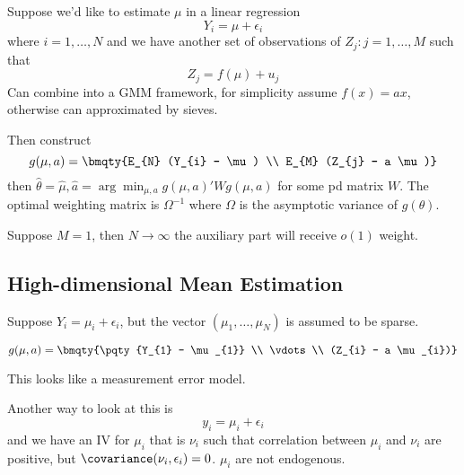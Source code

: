 Suppose we'd like to estimate \(\mu\) in a linear regression 
\begin{equation*}
    Y_{i} = \mu + \epsilon_{i} 
\end{equation*}
where \(i = 1,\dots,N\)
and we have another set of observations of \(Z_{j}: j =1,\dots,M\) such that 
\begin{equation*}
    Z_{j} = f (\mu) + u_{j}
\end{equation*}
Can combine into a GMM framework, for simplicity assume \(f(x)= ax\), otherwise can approximated by sieves. 

Then construct 
\begin{equation*}
    g(\mu, a) = \bmqty{E_{N} (Y_{i} - \mu) \\ E_{M} (Z_{j} - a \mu)}  
\end{equation*}
then \(\hat{\theta} = \hat{\mu}, \hat{a} = \arg \min_{\mu,a} g(\mu,a)' W g(\mu,a)\) for some pd matrix \(W\). The optimal weighting matrix is \(\Omega^{-1}\) where \(\Omega\) is the asymptotic variance of \({g}(\theta)\).

Suppose \(M= 1\), then \(N\to \infty\) the auxiliary part will receive \(o(1)\) weight. 

\subsection{High-dimensional Mean Estimation}

Suppose \(Y_{i} = \mu_{i} + \epsilon_{i}\), but the vector \((\mu_{1}, \dots, \mu_{N})\) is assumed to be sparse. 

\begin{equation*}
    g({\mu}, a) = \bmqty{\pqty{Y_{1} - \mu_{1}} \\ \vdots \\ (Z_{i} - a \mu_{i})}
\end{equation*}

This looks like a measurement error model. 

Another way to look at this is 
\begin{equation*}
    y_{i} = \mu_{i} + \epsilon_{i}
\end{equation*}
and we have an IV for \(\mu_{i}\) that is \(\nu_{i}\) such that correlation between \(\mu_{i}\) and \(\nu_{i}\) are positive, but \(\covariance(\nu_{i}, \epsilon_{i}) = 0\). \(\mu_{i}\) are not endogenous. 